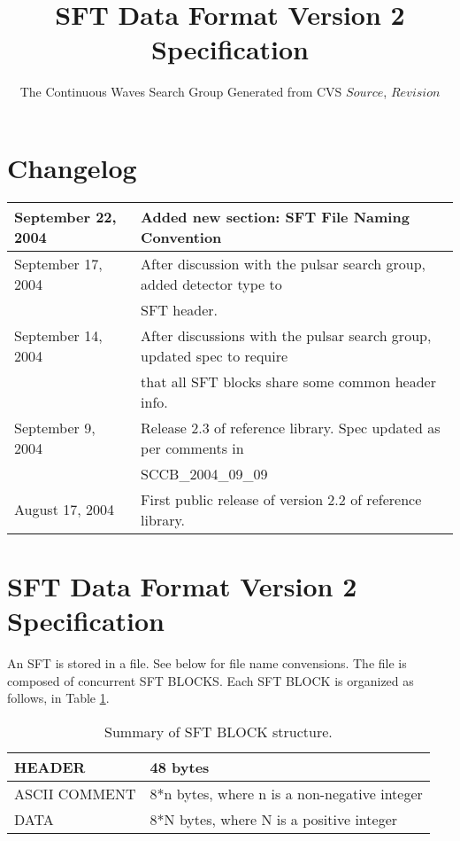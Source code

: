 \documentclass{ligodcc}
\title{SFT Data Format Version 2 Specification}
\author{The Continuous Waves Search Group \break Generated from CVS $Source$, $Revision$ }
\begin{document}
\maketitle

\section{Changelog}


\begin{table}[ht]
\centering
\begin{tabular}{|l|l|}
\hline
September 22, 2004 & Added new section: SFT File Naming Convention \\
\hline
September 17, 2004 & After discussion with the pulsar search group, added detector type to\\
   & SFT header. \\
\hline
September 14, 2004 & After discussions with the pulsar search group, updated spec to require\\
   & that all SFT blocks share some common header info. \\
\hline
September 9, 2004 & Release 2.3 of reference library.  Spec updated as per comments in\\
   & SCCB\_2004\_09\_09 \\
\hline
August 17, 2004  & First public release of version 2.2 of reference library. \\
\hline
\end{tabular}
\end{table}
 
\section{SFT Data Format Version 2 Specification}

An SFT is stored in a file. See below for file name convensions. The
file is composed of concurrent SFT BLOCKS. Each SFT BLOCK is organized as follows,
in Table \ref{tab:summary_struct}.

\begin{table}[ht]
\centering
\begin{tabular}{|l|l|}
\hline
   HEADER & 48 bytes\\
\hline

 ASCII COMMENT & 8*n bytes,
 where n is a non-negative
 integer\\
\hline

  DATA & 8*N bytes,
 where N is a positive
 integer\\
\hline
\end{tabular}
\caption{Summary of SFT BLOCK structure.}
\label{tab:summary_struct}
\end{table}
\end{document}
